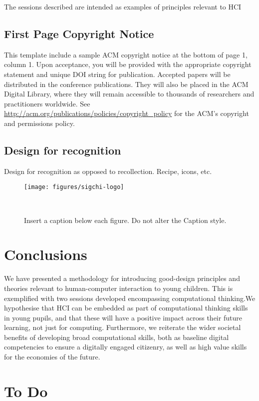 \documentclass{sig-alternate}
\begin{document}
The sessions described are intended as examples of principles relevant to HCI  


\subsection{First Page Copyright Notice}
This template include a sample ACM copyright notice at the bottom of
page 1, column 1.  Upon acceptance, you will be provided with the
appropriate copyright statement and unique DOI string for publication.
Accepted papers will be distributed in the conference
publications. They will also be placed in the ACM Digital Library,
where they will remain accessible to thousands of researchers and
practitioners worldwide. See
\url{http://acm.org/publications/policies/copyright_policy} for the
ACM’s copyright and permissions policy.


\subsection{Design for recognition}
Design for recognition as opposed to recollection. 
Recipe, icons, etc.
\begin{figure}
\centering
  \texttt{[image: figures/sigchi-logo]}
  \caption{Insert a caption below each figure. Do not alter the
    Caption style.}~\label{fig:figure1}
\end{figure}


\section{Conclusions}
We have presented a methodology for introducing good-design principles and theories relevant to human-computer interaction to young children. This is exemplified with two sessions developed encompassing computational thinking.We hypothesise that HCI can be embedded as part of computational thinking skills in young pupils, and that these will have a positive impact across their future learning, not just for computing. Furthermore, we reiterate the wider societal benefits of developing broad computational skills, both as baseline digital competencies to ensure a digitally engaged citizenry, as well as high value skills for the economies of the future.






\section*{To Do}
\end{document}

